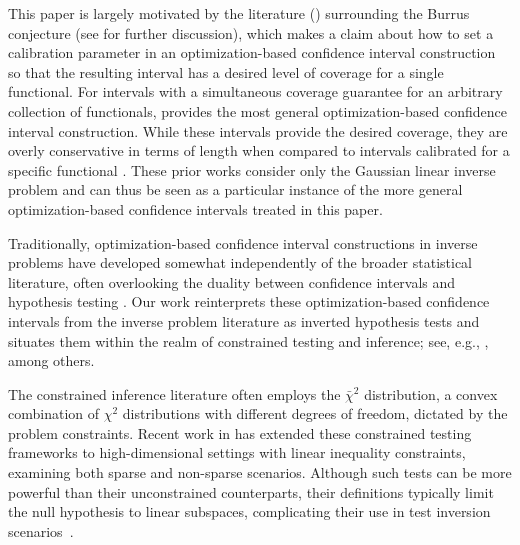 \documentclass[11pt]{article}
\numberwithin{equation}{section}
\numberwithin{figure}{section}
\begin{document}
This paper is largely motivated by the literature (\cite{rust_burrus, oleary_rust, rust1994confidence, tenorio2007confidence, patil, stanley_unfolding}) surrounding the Burrus conjecture (see  for further discussion), which makes a claim about how to set a calibration parameter in an optimization-based confidence interval construction so that the resulting interval has a desired level of coverage for a single functional.
For intervals with a simultaneous coverage guarantee for an arbitrary collection of functionals, \cite{stark1992inference} provides the most general optimization-based confidence interval construction.
While these intervals provide the desired coverage, they are overly conservative in terms of length when compared to intervals calibrated for a specific functional \cite{stanley_unfolding}.
These prior works consider only the Gaussian linear inverse problem and can thus be seen as a particular instance of the more general optimization-based confidence intervals treated in this paper. 


Traditionally, optimization-based confidence interval constructions in inverse problems have developed somewhat independently of the broader statistical literature, often overlooking the duality between confidence intervals and hypothesis testing \cite{casella_berger, wasserman2004all, lehmann_romano}. 
Our work reinterprets these optimization-based confidence intervals from the inverse problem literature as inverted hypothesis tests and situates them within the realm of constrained testing and inference; see, e.g., \cite{gourieroux, wolak87, robertson, shapiro1988towards, wolak89,molenberghs2007likelihood}, among others.

The constrained inference literature often employs the $\bar{\chi}^2$ distribution, a convex combination of $\chi^2$ distributions with different degrees of freedom, dictated by the problem constraints.
Recent work in \cite{yu2019constrained} has extended these constrained testing frameworks to high-dimensional settings with linear inequality constraints, examining both sparse and non-sparse scenarios. 
Although such tests can be more powerful than their unconstrained counterparts, their definitions typically limit the null hypothesis to linear subspaces, complicating their use in test inversion scenarios~\cite{silvapulle2011constrained}.
\end{document}
